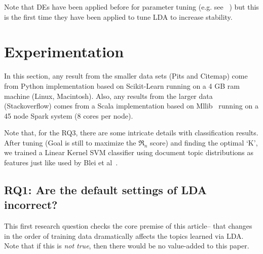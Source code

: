 \documentclass[twocolumn,5p,sort&compress]{elsarticle}
\theoremstyle{break}
\begin{document}
Note that DEs have been
applied before for parameter tuning (e.g. see~\cite{omran2005differential,chiha2012tuning, fu2016tuning} ) but this is the first time they have been
applied to tune LDA to increase stability.

\section{Experimentation}\label{sect:results}

In this section,
 any result from the smaller data sets (Pits and Citemap) come
from Python implementation based on Scikit-Learn running on a 4 GB ram machine (Linux, Macintosh).
Also,
  any results from the larger data (Stackoverflow) comes from a Scala implementation
  based on Mllib~\cite{meng2016mllib} running on a 45 node Spark system (8 cores per node).
  
  Note that, for the RQ3, there are some intricate details with classification results. After tuning (Goal is still to maximize the $\Re_n$ score) and finding the optimal `K', we trained a Linear Kernel SVM classifier using document topic distributions as features just like used by Blei et al~\cite{blei2003latent}.


\subsection{\textbf{RQ1: Are the default settings of LDA incorrect?}}\label{sect:unstable}


This first research question checks the core premise of this article-- that changes
in the order of training data dramatically affects the topics learned via LDA.
Note that if this is {\em not true}, then there would be no value-added to this paper. 
\end{document}
